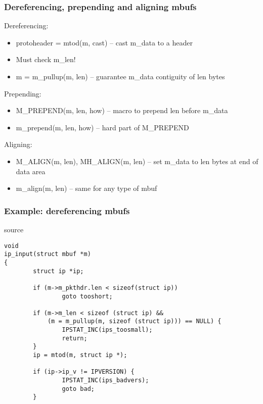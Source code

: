 \documentclass{beamer}
\begin{document}
\begin{frame}
\frametitle{Dereferencing, prepending and aligning mbufs}
  \begin{itemize}
    \item{Dereferencing:
	\begin{itemize}
	  \item{protoheader = mtod(m, cast) -- cast m\_data to a header}
	  \item{Must check m\_len!}
	  \item{m = m\_pullup(m, len) --
		guarantee m\_data contiguity of len bytes}
	\end{itemize}
    }
 {
    \item{Prepending:
	\begin{itemize}
	  \item{M\_PREPEND(m, len, how) -- macro to prepend len before m\_data}
	  \item{m\_prepend(m, len, how) -- hard part of M\_PREPEND}
	\end{itemize}
    }
}
 {
    \item{Aligning:
	\begin{itemize}
	  \item{M\_ALIGN(m, len), MH\_ALIGN(m, len) -- set m\_data to len bytes
		at end of data area}
	  \item{m\_align(m, len) -- same for any type of mbuf}
	\end{itemize}
    }
}
  \end{itemize}
\end{frame}


\begin{frame}[fragile]
\frametitle{Example: dereferencing mbufs}
\begin{beamercolorbox}[rounded=true,shadow=true]{source}
\lstset{language=C}
\scriptsize\begin{lstlisting}
void
ip_input(struct mbuf *m)
{
        struct ip *ip;

        if (m->m_pkthdr.len < sizeof(struct ip))
                goto tooshort;

        if (m->m_len < sizeof (struct ip) &&
            (m = m_pullup(m, sizeof (struct ip))) == NULL) {
                IPSTAT_INC(ips_toosmall);
                return;
        }
        ip = mtod(m, struct ip *);

        if (ip->ip_v != IPVERSION) {
                IPSTAT_INC(ips_badvers);
                goto bad;
        }
\end{lstlisting}
\end{beamercolorbox}
\end{frame}
\end{document}
